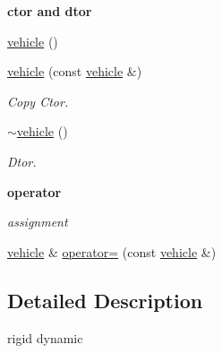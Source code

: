 \begin{Indent}{\bf ctor and dtor}\par
{\em \label{_amgrp98fbd3e5ae66fcd014fb744fec76c58d}
 }\begin{DoxyCompactItemize}
\item 
\hyperlink{classnebula_1_1content_1_1actor_1_1renderer_1_1vehicle_ab594788c7c171253d747fa8ccff048e3}{vehicle} ()
\item 
\hyperlink{classnebula_1_1content_1_1actor_1_1renderer_1_1vehicle_a7209e183cf1631b8ae8d3a3451467e22}{vehicle} (const \hyperlink{classnebula_1_1content_1_1actor_1_1renderer_1_1vehicle}{vehicle} \&)
\begin{DoxyCompactList}\small\item\em Copy Ctor. \item\end{DoxyCompactList}\item 
\hyperlink{classnebula_1_1content_1_1actor_1_1renderer_1_1vehicle_a167c746fa67918e6fd6dc85550e972e8}{$\sim$vehicle} ()
\begin{DoxyCompactList}\small\item\em Dtor. \item\end{DoxyCompactList}\end{DoxyCompactItemize}
\end{Indent}
\begin{Indent}{\bf operator}\par
{\em \label{_amgrp4b583376b2767b923c3e1da60d10de59}
 assignment }\begin{DoxyCompactItemize}
\item 
\hyperlink{classnebula_1_1content_1_1actor_1_1renderer_1_1vehicle}{vehicle} \& \hyperlink{classnebula_1_1content_1_1actor_1_1renderer_1_1vehicle_a3687fe4866ea01c7f21356c2f7739493}{operator=} (const \hyperlink{classnebula_1_1content_1_1actor_1_1renderer_1_1vehicle}{vehicle} \&)
\end{DoxyCompactItemize}
\end{Indent}


\subsection{Detailed Description}
rigid dynamic 

